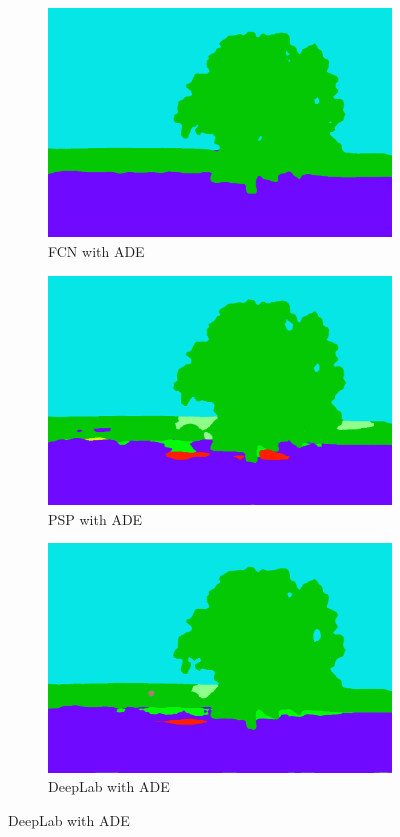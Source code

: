 \documentclass[12pt,a4paper]{report}
\newcommand{\acronym}{\MakeUppercase}
\begin{document}
\begin{figure}[h!]
\begin{subfigure}[b]{0.3\textwidth}
			\includegraphics[width=\textwidth]{out_ade_fcn}
			\caption{\acronym{fcn} with \acronym{ade}}
		\end{subfigure}
		\begin{subfigure}[b]{0.3\textwidth}
			\includegraphics[width=\textwidth]{out_ade_psp}
			\caption{\acronym{psp} with \acronym{ade}}
		\end{subfigure}
		\begin{subfigure}[b]{0.3\textwidth}
			\includegraphics[width=\textwidth]{out_ade_deep}
			\caption{DeepLab with \acronym{ade}}
		\end{subfigure}
		\label{fig:out}
	\end{figure}
	
\end{document}
